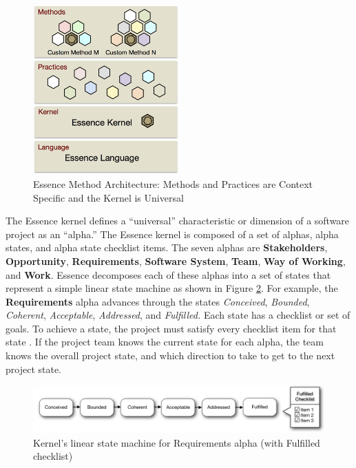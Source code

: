 \documentclass[preprint,12pt,3p]{elsarticle}
\begin{document}
\begin{figure}[h]\vspace*{4pt}
\centerline{\includegraphics[width=2.2in]{kernel_images/EssenceLayers}}
\caption{Essence Method Architecture: Methods and Practices are Context Specific and the Kernel is Universal}\vspace*{-6pt}\label{EssenceLayers}
\end{figure}

The Essence kernel defines a ``universal'' characteristic or dimension of a software project as an ``alpha.'' The Essence kernel is composed of a set of alphas, alpha states, and alpha state checklist items. The seven alphas are \textbf{Stakeholders}, \textbf{Opportunity}, \textbf{Requirements}, \textbf{Software System}, \textbf{Team}, \textbf{Way of Working}, and \textbf{Work}. Essence decomposes each of these alphas into a set of states that represent a simple linear state machine as shown in Figure \ref{StateMachine}. For example, the \textbf{Requirements} alpha advances through the states \textit{Conceived}, \textit{Bounded}, \textit{Coherent}, \textit{Acceptable}, \textit{Addressed}, and \textit{Fulfilled.} Each state has a checklist or set of goals. To achieve a state, the project must satisfy every checklist item for that state \cite{OMGStandard}. If the project team knows the current state for each alpha, the team knows the overall project state, and which direction to take to get to the next project state.
 
\begin{figure}[h]\vspace*{4pt}
\centerline{\includegraphics[width=5.4in]{kernel_images/StateMachineRequirements}}
\caption{Kernel's linear state machine for Requirements alpha (with Fulfilled checklist)}\vspace*{-6pt}\label{StateMachine}
\end{figure}
\end{document}
